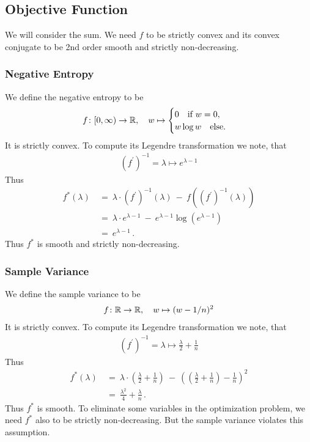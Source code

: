 \subsection*{Objective Function}
We will consider the sum.
We need $f$ to be strictly convex and its convex conjugate
to be 2nd order smooth and strictly non-decreasing.
\subsubsection*{Negative Entropy}
We define the negative entropy to be
\begin{gather}
  f
  \colon
  [0,\infty)
  \to
  \mathbb{R}
  ,\quad
  w
  \mapsto
  \begin{cases}
    0\quad\text{if}\ w=0,\\
    w\log w\quad
    \text{else}.
  \end{cases}
\end{gather}
It is strictly convex. To compute its Legendre transformation we note, that
\begin{gather}
  (f^{'})^{-1}
  =
  \lambda\mapsto
  e^{\lambda-1}
\end{gather}
Thus
  \begin{align*}
  f^*
  (\lambda)
  &
  \ 
  =
  \ 
  \lambda
    \cdot
    (f^{'})^{-1}(\lambda)
  \ 
    -
  \ 
    f
    \left( 
      (f^{'})^{-1}(\lambda)
    \right)
    \\
  &
  \ 
  =
  \ 
  \lambda
    \cdot
  e^{\lambda-1}
  \ 
    -
  \ 
  e^{\lambda-1}
  \log
  \left( 
  e^{\lambda-1}
  \right)
  \\
  &
  \ 
  =
  \ 
  e^{\lambda-1}
  \,.
  \end{align*}
  Thus $f^*$ is smooth and strictly non-decreasing.


  \subsubsection*{Sample Variance}
We define the sample variance to be
\begin{gather}
  f
  \colon
  \mathbb{R}
  \to
  \mathbb{R}
  ,\quad
  w
  \mapsto
  (w-1/n)^2
\end{gather}
It is strictly convex. To compute its Legendre transformation we note, that
\begin{gather}
  (f^{'})^{-1}
  =
  \lambda\mapsto
  \frac{\lambda}{2}
  +
  \frac{1}{n}
\end{gather}
Thus
  \begin{align*}
  f^*
  (\lambda)
  &
  \ 
  =
  \ 
  \lambda
    \cdot
    \left( 
  \frac{\lambda}{2}
  +
  \frac{1}{n}
    \right)
  \ 
    -
  \ 
    \left( 
    \left( 
  \frac{\lambda}{2}
  +
  \frac{1}{n}
    \right)
    -
    \frac{1}{n}
    \right)
    ^2
    \\
  &
  \ 
  =
  \ 
  \frac{\lambda^2}{4}
  +
  \frac{\lambda}{n}
  \,.
  \end{align*}
  Thus $f^*$ is smooth.
  To eliminate some variables in the optimization problem,
  we need $f^*$ also to be
  strictly non-decreasing. But the sample variance violates this assumption.


